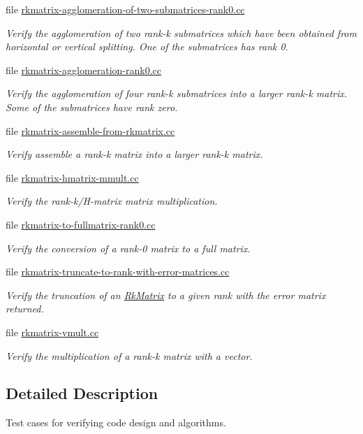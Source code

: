 \begin{DoxyCompactItemize}
file \hyperlink{rkmatrix-agglomeration-of-two-submatrices-rank0_8cc}{rkmatrix-\/agglomeration-\/of-\/two-\/submatrices-\/rank0.\+cc}
\begin{DoxyCompactList}\small\item\em Verify the agglomeration of two rank-\/k submatrices which have been obtained from horizontal or vertical splitting. One of the submatrices has rank 0. \end{DoxyCompactList}\item 
file \hyperlink{rkmatrix-agglomeration-rank0_8cc}{rkmatrix-\/agglomeration-\/rank0.\+cc}
\begin{DoxyCompactList}\small\item\em Verify the agglomeration of four rank-\/k submatrices into a larger rank-\/k matrix. Some of the submatrices have rank zero. \end{DoxyCompactList}\item 
file \hyperlink{rkmatrix-assemble-from-rkmatrix_8cc}{rkmatrix-\/assemble-\/from-\/rkmatrix.\+cc}
\begin{DoxyCompactList}\small\item\em Verify assemble a rank-\/k matrix into a larger rank-\/k matrix. \end{DoxyCompactList}\item 
file \hyperlink{rkmatrix-hmatrix-mmult_8cc}{rkmatrix-\/hmatrix-\/mmult.\+cc}
\begin{DoxyCompactList}\small\item\em Verify the rank-\/k/\+H-\/matrix matrix multiplication. \end{DoxyCompactList}\item 
file \hyperlink{rkmatrix-to-fullmatrix-rank0_8cc}{rkmatrix-\/to-\/fullmatrix-\/rank0.\+cc}
\begin{DoxyCompactList}\small\item\em Verify the conversion of a rank-\/0 matrix to a full matrix. \end{DoxyCompactList}\item 
file \hyperlink{rkmatrix-truncate-to-rank-with-error-matrices_8cc}{rkmatrix-\/truncate-\/to-\/rank-\/with-\/error-\/matrices.\+cc}
\begin{DoxyCompactList}\small\item\em Verify the truncation of an \hyperlink{classRkMatrix}{Rk\+Matrix} to a given rank with the error matrix returned. \end{DoxyCompactList}\item 
file \hyperlink{rkmatrix-vmult_8cc}{rkmatrix-\/vmult.\+cc}
\begin{DoxyCompactList}\small\item\em Verify the multiplication of a rank-\/k matrix with a vector. \end{DoxyCompactList}\end{DoxyCompactItemize}


\subsection{Detailed Description}
Test cases for verifying code design and algorithms. 

